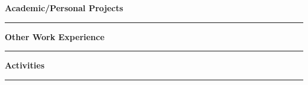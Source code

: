 \documentclass{article}
\begin{document}
\noindent\large{\textbf{Academic/Personal Projects}}\\[-0.6em]
\noindent\rule{\textwidth}{0.4pt}
\begin{normalsize}
    
\end{normalsize}
\vspace{0.7em}

\noindent\large{\textbf{Other Work Experience}}\\[-0.6em]
\noindent\rule{\textwidth}{0.4pt}
\begin{normalsize}
    
\end{normalsize}
\vspace{0.7em}


\noindent\large{\textbf{Activities}}\\[-0.6em]
\noindent\rule{\textwidth}{0.4pt}
\begin{normalsize}
    
\end{normalsize}
\vspace{0.7em}
\end{document}
